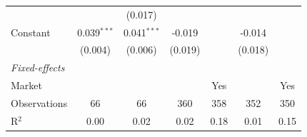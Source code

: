 \begin{tabular}{lcccccc}
                                            &               & (0.017)       &              &               &         &   \\   
   Constant                                 & 0.039$^{***}$ & 0.041$^{***}$ & -0.019       &               & -0.014  &   \\   
                                            & (0.004)       & (0.006)       & (0.019)      &               & (0.018) &   \\   
   \midrule
   \emph{Fixed-effects}\\
   Market                                   &               &               &              & Yes           &         & Yes\\  
   \midrule
   Observations                             & 66            & 66            & 360          & 358           & 352     & 350\\  
   R$^2$                                    & 0.00          & 0.02          & 0.02         & 0.18          & 0.01    & 0.15\\  
   \midrule \midrule
\end{tabular}
